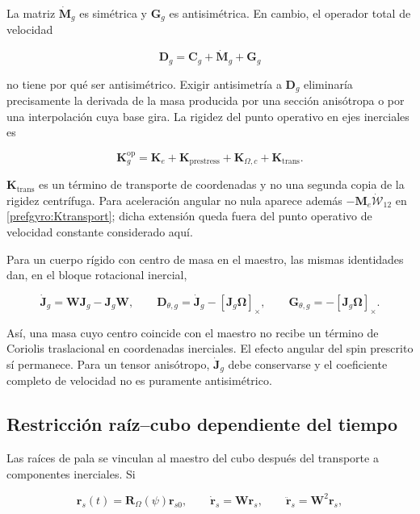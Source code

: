 La matriz $\dot{\bm M}_g$ es simétrica y $\bm G_g$ es antisimétrica. En
cambio, el operador total de velocidad

\begin{equation}
 \bm D_g=\bm C_g+\dot{\bm M}_g+\bm G_g
 \label{prefgyro:Dtotal}
\end{equation}

no tiene por qué ser antisimétrico. Exigir antisimetría a $\bm D_g$ eliminaría
precisamente la derivada de la masa producida por una sección anisótropa o por
una interpolación cuya base gira. La rigidez del punto operativo en ejes
inerciales es

\begin{equation}
 \bm K_g^{\mathrm{op}}
 =\bm K_e+\bm K_{\mathrm{prestress}}
 +\bm K_{\Omega,c}+\bm K_{\mathrm{trans}}.
 \label{prefgyro:Koperativa}
\end{equation}

$\bm K_{\mathrm{trans}}$ es un término de transporte de coordenadas y no una
segunda copia de la rigidez centrífuga. Para aceleración angular no nula aparece
además $-\bm M_e\dot{\bm{\mathcal W}}_{12}$ en
\eqref{prefgyro:Ktransport}; dicha extensión queda fuera del punto operativo
de velocidad constante considerado aquí.

Para un cuerpo rígido con centro de masa en el maestro, las mismas identidades
dan, en el bloque rotacional inercial,

\begin{equation}
 \dot{\bm J}_g=\bm W\bm J_g-\bm J_g\bm W,
 \qquad
 \bm D_{\theta,g}=\dot{\bm J}_g-[\bm J_g\bm\Omega]_\times,
 \qquad
 \bm G_{\theta,g}=-[\bm J_g\bm\Omega]_\times.
 \label{prefgyro:rigidbody-inertial}
\end{equation}

Así, una masa cuyo centro coincide con el maestro no recibe un término de
Coriolis traslacional en coordenadas inerciales. El efecto angular del spin
prescrito sí permanece. Para un tensor anisótropo, $\dot{\bm J}_g$ debe
conservarse y el coeficiente completo de velocidad no es puramente
antisimétrico.

\subsection{Restricción raíz--cubo dependiente del tiempo}
\label{prefgyro:mpc}

Las raíces de pala se vinculan al maestro del cubo después del transporte a
componentes inerciales. Si

\begin{equation}
 \bm r_s(t)=\bm R_\Omega(\psi)\bm r_{s0},
 \qquad
 \dot{\bm r}_s=\bm W\bm r_s,
 \qquad
 \ddot{\bm r}_s=\bm W^2\bm r_s,
 \label{prefgyro:rslave}
\end{equation}

